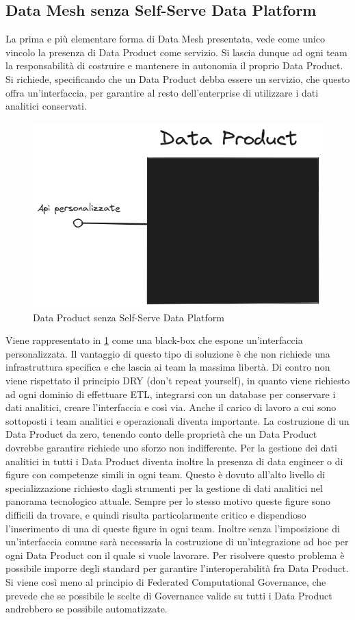 \documentclass[12pt]{report}
\begin{document}
\subsection{Data Mesh senza Self-Serve Data Platform}
La prima e più elementare forma di Data Mesh presentata, vede come unico vincolo la presenza di Data Product come servizio.
Si lascia dunque ad ogni team la responsabilità di costruire e mantenere in autonomia il proprio Data Product.
Si richiede, specificando che un Data Product debba essere un servizio, che questo offra un'interfaccia, per garantire al resto dell'enterprise di utilizzare i dati analitici conservati.
\begin{figure}
    \centering
    \includegraphics[width=0.5\linewidth]{immagini/data mesh elementare.png}
    \caption{Data Product senza Self-Serve Data Platform}
    \label{fig:dp senza SSDP}
\end{figure}

Viene rappresentato in \ref{fig:dp senza SSDP} come una black-box che espone un'interfaccia personalizzata.
Il vantaggio di questo tipo di soluzione è che non richiede una infrastruttura specifica e che lascia ai team la massima libertà.
Di contro non viene rispettato il principio DRY (don't repeat yourself), in quanto viene richiesto ad ogni dominio di effettuare ETL, integrarsi con un database per conservare i dati analitici, creare l'interfaccia e così via.
Anche il carico di lavoro a cui sono sottoposti i team analitici e operazionali diventa importante.
La costruzione di un Data Product da zero, tenendo conto delle proprietà che un Data Product dovrebbe garantire richiede uno sforzo non indifferente.
Per la gestione dei dati analitici in tutti i Data Product diventa inoltre la presenza di data engineer o di figure con competenze simili in ogni team.
Questo è dovuto all'alto livello di specializzazione richiesto dagli strumenti per la gestione di dati analitici nel panorama tecnologico attuale.
Sempre per lo stesso motivo queste figure sono difficili da trovare, e quindi risulta particolarmente critico e dispendioso l'inserimento di una di queste figure in ogni team.
Inoltre senza l'imposizione di un'interfaccia comune sarà necessaria la costruzione di un'integrazione ad hoc per ogni Data Product con il quale si vuole lavorare. 
Per risolvere questo problema è possibile imporre degli standard per garantire l'interoperabilità fra Data Product.
Si viene così meno al principio di Federated Computational Governance, che prevede che se possibile le scelte di Governance valide su tutti i Data Product andrebbero se possibile automatizzate. 
\end{document}
